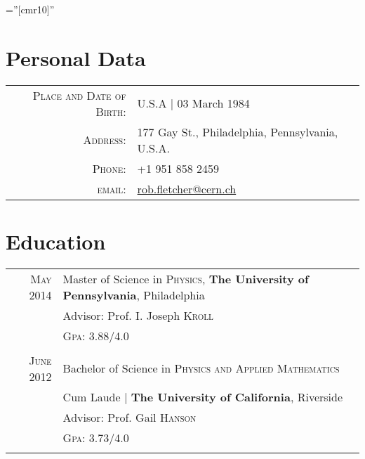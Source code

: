 \documentclass[a4paper,10pt]{article} %
\begin{document}
\pagestyle{empty} %

\font\fb=''[cmr10]'' %


\par{\bigskip\par} %

\section{Personal Data}

\begin{tabular}{rl}
\textsc{Place and Date of Birth:} & U.S.A  | 03 March 1984 \\
\textsc{Address:} & 177 Gay St., Philadelphia, Pennsylvania, U.S.A. \\
\textsc{Phone:} & +1 951 858 2459\\
\textsc{email:} & \href{mailto:rob.fletcher@cern.ch}{rob.fletcher@cern.ch}
\end{tabular}



\section{Education}

\begin{tabular}{rl}	
\textsc{May} 2014 & Master of Science in \textsc{Physics}, \textbf{The University of Pennsylvania}, Philadelphia\\
&\small Advisor: Prof. I. Joseph \textsc{Kroll}\\
&\normalsize \textsc{Gpa}: 3.88/4.0\\
&\\


\textsc{June} 2012& Bachelor of Science in \textsc{}\textsc{Physics and Applied Mathematics} \\
&Cum Laude | \normalsize\textbf{The University of California}, Riverside\\
&\small Advisor: Prof. Gail \textsc{Hanson}\\
&\normalsize \textsc{Gpa}: 3.73/4.0 \\
&\\


\end{tabular}
\end{document}
